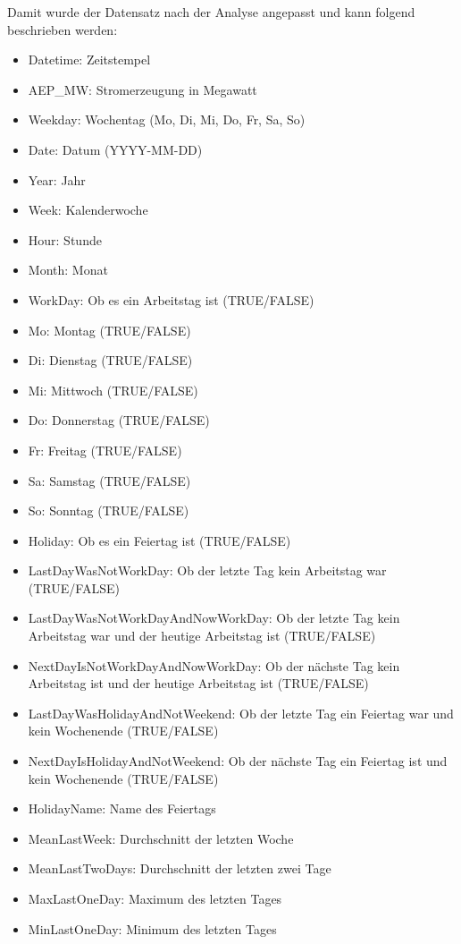 \documentclass[11pt,ngerman,a4paper,]{article}
\providecommand{\tightlist}{%
  \setlength{\itemsep}{0pt}\setlength{\parskip}{0pt}}
\begin{document}
Damit wurde der Datensatz nach der Analyse angepasst und kann folgend beschrieben werden:

\begin{itemize}
\tightlist
\item
  Datetime: Zeitstempel
\item
  AEP\_MW: Stromerzeugung in Megawatt
\item
  Weekday: Wochentag (Mo, Di, Mi, Do, Fr, Sa, So)
\item
  Date: Datum (YYYY-MM-DD)
\item
  Year: Jahr
\item
  Week: Kalenderwoche
\item
  Hour: Stunde
\item
  Month: Monat
\item
  WorkDay: Ob es ein Arbeitstag ist (TRUE/FALSE)
\item
  Mo: Montag (TRUE/FALSE)
\item
  Di: Dienstag (TRUE/FALSE)
\item
  Mi: Mittwoch (TRUE/FALSE)
\item
  Do: Donnerstag (TRUE/FALSE)
\item
  Fr: Freitag (TRUE/FALSE)
\item
  Sa: Samstag (TRUE/FALSE)
\item
  So: Sonntag (TRUE/FALSE)
\item
  Holiday: Ob es ein Feiertag ist (TRUE/FALSE)
\item
  LastDayWasNotWorkDay: Ob der letzte Tag kein Arbeitstag war (TRUE/FALSE)
\item
  LastDayWasNotWorkDayAndNowWorkDay: Ob der letzte Tag kein Arbeitstag war und der heutige Arbeitstag ist (TRUE/FALSE)
\item
  NextDayIsNotWorkDayAndNowWorkDay: Ob der nächste Tag kein Arbeitstag ist und der heutige Arbeitstag ist (TRUE/FALSE)
\item
  LastDayWasHolidayAndNotWeekend: Ob der letzte Tag ein Feiertag war und kein Wochenende (TRUE/FALSE)
\item
  NextDayIsHolidayAndNotWeekend: Ob der nächste Tag ein Feiertag ist und kein Wochenende (TRUE/FALSE)
\item
  HolidayName: Name des Feiertags
\item
  MeanLastWeek: Durchschnitt der letzten Woche
\item
  MeanLastTwoDays: Durchschnitt der letzten zwei Tage
\item
  MaxLastOneDay: Maximum des letzten Tages
\item
  MinLastOneDay: Minimum des letzten Tages
\end{itemize}
\end{document}
